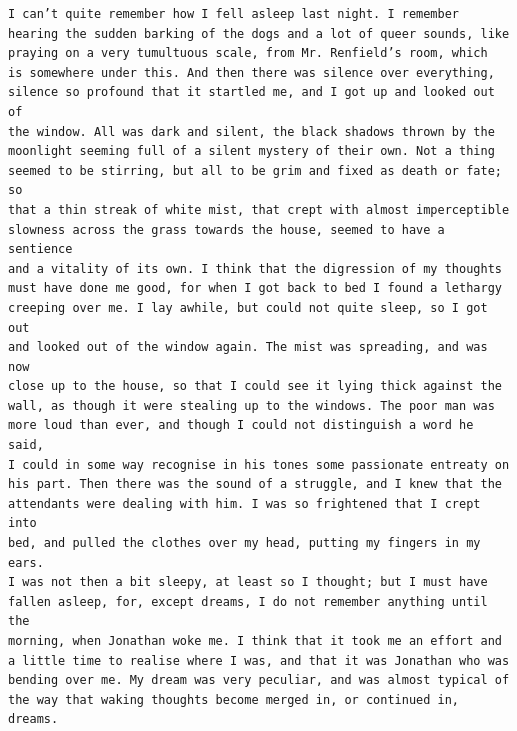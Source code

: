 \documentclass{article}
\begin{document}
\begin{verbatim}
I can’t quite remember how I fell asleep last night. I remember
hearing the sudden barking of the dogs and a lot of queer sounds, like
praying on a very tumultuous scale, from Mr. Renfield’s room, which
is somewhere under this. And then there was silence over everything,
silence so profound that it startled me, and I got up and looked out of
the window. All was dark and silent, the black shadows thrown by the
moonlight seeming full of a silent mystery of their own. Not a thing
seemed to be stirring, but all to be grim and fixed as death or fate; so
that a thin streak of white mist, that crept with almost imperceptible
slowness across the grass towards the house, seemed to have a sentience
and a vitality of its own. I think that the digression of my thoughts
must have done me good, for when I got back to bed I found a lethargy
creeping over me. I lay awhile, but could not quite sleep, so I got out
and looked out of the window again. The mist was spreading, and was now
close up to the house, so that I could see it lying thick against the
wall, as though it were stealing up to the windows. The poor man was
more loud than ever, and though I could not distinguish a word he said,
I could in some way recognise in his tones some passionate entreaty on
his part. Then there was the sound of a struggle, and I knew that the
attendants were dealing with him. I was so frightened that I crept into
bed, and pulled the clothes over my head, putting my fingers in my ears.
I was not then a bit sleepy, at least so I thought; but I must have
fallen asleep, for, except dreams, I do not remember anything until the
morning, when Jonathan woke me. I think that it took me an effort and
a little time to realise where I was, and that it was Jonathan who was
bending over me. My dream was very peculiar, and was almost typical of
the way that waking thoughts become merged in, or continued in, dreams.


\end{verbatim}
\end{document}
